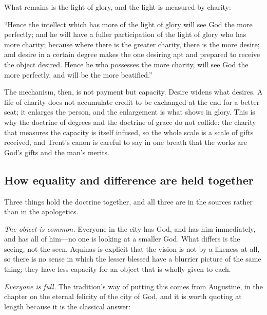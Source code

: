 What remains is the light of glory, and the light is measured by charity:

\begin{studyframe}
``Hence the intellect which has more of the light of glory will see God the more perfectly; and he will have a fuller participation of the light of glory who has more charity; because where there is the greater charity, there is the more desire; and desire in a certain degree makes the one desiring apt and prepared to receive the object desired. Hence he who possesses the more charity, will see God the more perfectly, and will be the more beatified.''
\end{studyframe}

The mechanism, then, is not payment but capacity. Desire widens what desires. A life of charity does not accumulate credit to be exchanged at the end for a better seat; it enlarges the person, and the enlargement is what shows in glory. This is why the doctrine of degrees and the doctrine of grace do not collide: the charity that measures the capacity is itself infused, so the whole scale is a scale of gifts received, and Trent's canon is careful to say in one breath that the works are God's gifts and the man's merits.

\subsection{How equality and difference are held together}

Three things hold the doctrine together, and all three are in the sources rather than in the apologetics.

\emph{The object is common.} Everyone in the city has God, and has him immediately, and has all of him---no one is looking at a smaller God. What differs is the seeing, not the seen. Aquinas is explicit that the vision is not by a likeness at all, so there is no sense in which the lesser blessed have a blurrier picture of the same thing; they have less capacity for an object that is wholly given to each.

\emph{Everyone is full.} The tradition's way of putting this comes from Augustine, in the chapter on the eternal felicity of the city of God, and it is worth quoting at length because it is the classical answer:

